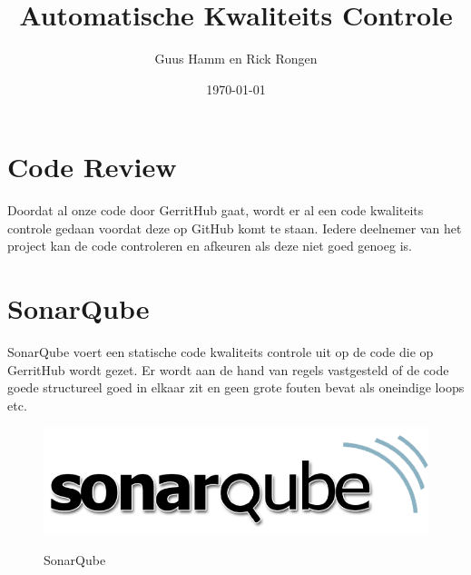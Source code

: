 \documentclass{scrreprt}
\title{Automatische Kwaliteits Controle}
\author{Guus Hamm en Rick Rongen}
\date{\today}
\begin{document}
	\maketitle
	\tableofcontents
	\newpage
	\chapter{Code Review}
	Doordat al onze code door GerritHub gaat, wordt er al een code kwaliteits controle gedaan voordat deze op GitHub komt te staan. Iedere deelnemer van het project kan de code controleren en afkeuren als deze niet goed genoeg is.
	\chapter{SonarQube}
	SonarQube voert een statische code kwaliteits controle uit op de code die op GerritHub wordt gezet. Er wordt aan de hand van regels vastgesteld of de code goede structureel goed in elkaar zit en geen grote fouten bevat als oneindige loops etc.
	\begin{figure}[ht]
		\centering
		\includegraphics[width=.8\linewidth]{sonarqube}
		\label{sonarqube}
		\caption{SonarQube}
	\end{figure}
\end{document}
